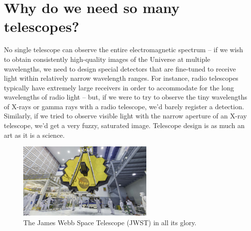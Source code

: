 \documentclass[11pt]{article}
\begin{document}
\section{Why do we need so many telescopes?}

No single telescope can observe the entire electromagnetic spectrum -- if we wish to obtain consistently high-quality images of the Universe at multiple wavelengths, we need to design special detectors that are fine-tuned to receive light within relatively narrow wavelength ranges. For instance, radio telescopes typically have extremely large receivers in order to accommodate for the long wavelengths of radio light -- but, if we were to try to observe the tiny wavelengths of X-rays or gamma rays with a radio telescope, we'd barely register a detection. Similarly, if we tried to observe visible light with the narrow aperture of an X-ray telescope, we'd get a very fuzzy, saturated image. Telescope design is as much an art as it is a science. 

\begin{figure}
    \centering
    \includegraphics[width=0.6\textwidth]{Images/jwst.jpg}
    \caption{The James Webb Space Telescope (JWST) in all its glory.}
    \label{fig:jwst}
\end{figure}
\end{document}
